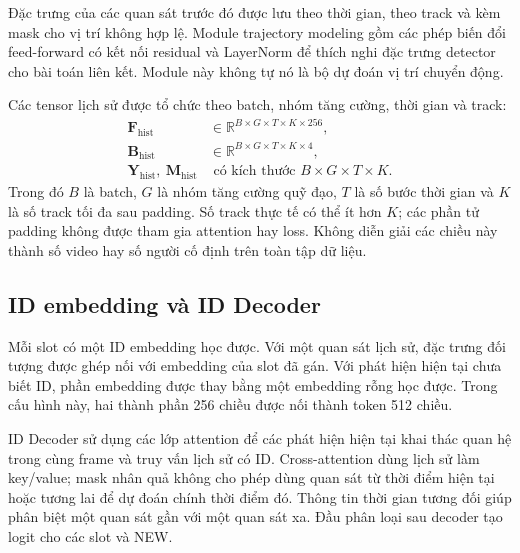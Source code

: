 Đặc trưng của các quan sát trước đó được lưu theo thời gian, theo track và kèm mask cho vị trí không hợp lệ. Module trajectory modeling gồm các phép biến đổi feed-forward có kết nối residual và LayerNorm để thích nghi đặc trưng detector cho bài toán liên kết. Module này không tự nó là bộ dự đoán vị trí chuyển động.

Các tensor lịch sử được tổ chức theo batch, nhóm tăng cường, thời gian và track:
\begin{equation}
 \begin{aligned}
  \mathbf F_{\mathrm{hist}}&\in\mathbb R^{B\times G\times T\times K\times256},\\
  \mathbf B_{\mathrm{hist}}&\in\mathbb R^{B\times G\times T\times K\times4},\\
  \mathbf Y_{\mathrm{hist}},\ \mathbf M_{\mathrm{hist}}
   &\text{ có kích thước }B\times G\times T\times K.
 \end{aligned}
 \label{eq:history-tensors}
\end{equation}
Trong đó $B$ là batch, $G$ là nhóm tăng cường quỹ đạo, $T$ là số bước thời gian
và $K$ là số track tối đa sau padding. Số track thực tế có thể ít hơn $K$;
các phần tử padding không được tham gia attention hay loss. Không diễn giải
các chiều này thành số video hay số người cố định trên toàn tập dữ liệu.

\FloatBarrier
\subsection{ID embedding và ID Decoder}
Mỗi slot có một ID embedding học được. Với một quan sát lịch sử, đặc trưng đối tượng được ghép nối với embedding của slot đã gán. Với phát hiện hiện tại chưa biết ID, phần embedding được thay bằng một embedding rỗng học được. Trong cấu hình này, hai thành phần 256 chiều được nối thành token 512 chiều.

ID Decoder sử dụng các lớp attention để các phát hiện hiện tại khai thác quan hệ trong cùng frame và truy vấn lịch sử có ID. Cross-attention dùng lịch sử làm key/value; mask nhân quả không cho phép dùng quan sát từ thời điểm hiện tại hoặc tương lai để dự đoán chính thời điểm đó. Thông tin thời gian tương đối giúp phân biệt một quan sát gần với một quan sát xa. Đầu phân loại sau decoder tạo logit cho các slot và NEW.

